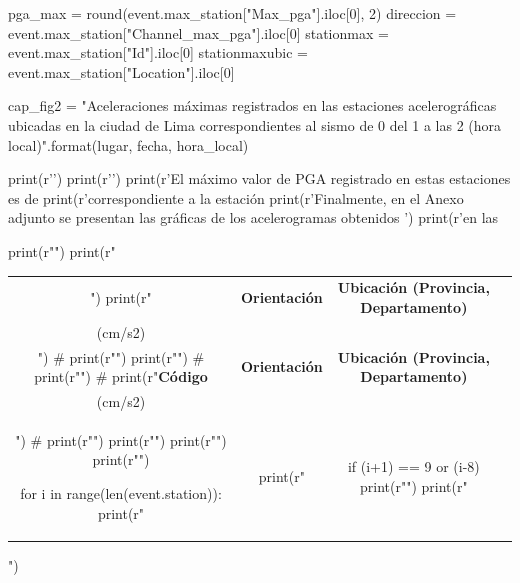 \documentclass[11pt, a4paper]{report}
\begin{document}
\begin{pycode}
pga_max = round(event.max_station["Max_pga"].iloc[0], 2)
direccion = event.max_station["Channel_max_pga"].iloc[0]
stationmax = event.max_station["Id"].iloc[0]
stationmaxubic = event.max_station["Location"].iloc[0]

cap_fig2 = "Aceleraciones máximas registrados en las estaciones acelerográficas ubicadas en la ciudad de Lima correspondientes al sismo de {0} del {1} a las {2} (hora local)".format(lugar, fecha, hora_local)

print(r'\newpage')
print(r'\noindent')
print(r'El máximo valor de PGA registrado en estas estaciones es de %
print(r'correspondiente a la estación %
print(r'Finalmente, en el Anexo adjunto se presentan las gráficas de los acelerogramas obtenidos ')
print(r'en las %

print(r"\renewcommand{\arraystretch}{1.2}")
print(r"\begin{longtable}{|c|c|c|c|}")
print(r"\caption{%
print(r"\hline")
print(r"\textbf{Código} & \textbf{Orientación} & \textbf{Ubicación (Provincia, Departamento)} & \textbf{\begin{tabular}[c]{@{}c@{}}PGA\\ (cm/s2)\end{tabular}} \\ \hline")
# print(r"\hline")
print(r"\endfirsthead")
# print(r"\hline")
# print(r"\textbf{Código} & \textbf{Orientación} & \textbf{Ubicación (Provincia, Departamento)} & \textbf{\begin{tabular}[c]{@{}c@{}}PGA\\ (cm/s2)\end{tabular}} \\ \hline")
# print(r"\hline")
print(r"\endhead")
print(r"\endfoot")
print(r"\endlastfoot")

for i in range(len(event.station)):
    print(r"\multirow{3}{*}{%
    print(r" & %
    print(r" & %
    if (i+1) == 9 or (i-8) %
        print(r"\pagebreak")
print(r"\end{longtable}")


\end{pycode}
\end{document}
